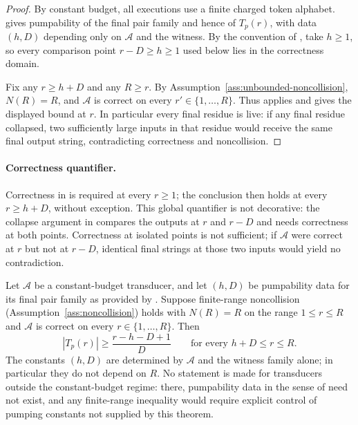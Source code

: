 \begin{proof}
By constant budget, all executions use a finite charged token alphabet.
 gives pumpability of the final pair family and
hence of $T_p(r)$, with data $(h,D)$ depending only on $\mathcal{A}$ and the
witness. By the convention of , take $h\ge1$,
so every comparison point $r-D\ge h\ge1$ used below lies in the correctness
domain.

Fix any $r\ge h+D$ and any $R\ge r$. By Assumption~\ref{ass:unbounded-noncollision},
$N(R)=R$, and $\mathcal{A}$ is correct on every $r'\in\{1,\ldots,R\}$. Thus
 applies and gives the displayed bound at $r$.
In particular every final residue is live: if any final residue collapsed, two
sufficiently large inputs in that residue would receive the same final output
string, contradicting correctness and noncollision.
\end{proof}

\paragraph{Correctness quantifier.}
Correctness in  is required at every $r\ge1$; the
conclusion then holds at every $r\ge h+D$, without exception. This global
quantifier is not decorative: the collapse argument in
 compares the outputs at $r$ and $r-D$ and
needs correctness at both points. Correctness at isolated points is not
sufficient; if $\mathcal{A}$ were correct at $r$ but not at $r-D$, identical
final strings at those two inputs would yield no contradiction.

\begin{corollary}
\label{app:cor:finite-tail}
Let $\mathcal{A}$ be a constant-budget transducer, and let $(h,D)$ be
pumpability data for its final pair family as provided by
. Suppose finite-range noncollision
(Assumption~\ref{ass:noncollision}) holds with $N(R)=R$ on the range
$1\le r\le R$ and $\mathcal{A}$ is correct on every
$r\in\{1,\ldots,R\}$. Then
\[
  |T_p(r)|\ge \frac{r-h-D+1}{D}
  \qquad\text{for every }h+D\le r\le R.
\]
The constants $(h,D)$ are determined by $\mathcal{A}$ and the witness family
alone; in particular they do not depend on $R$. No statement is made for
transducers outside the constant-budget regime: there, pumpability data in the
sense of  need not exist, and any finite-range
inequality would require explicit control of pumping constants not supplied by
this theorem.
\end{corollary}

